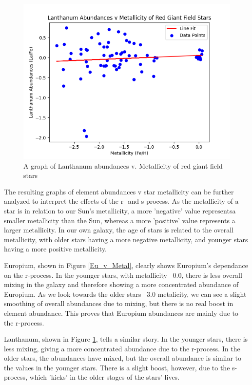 \begin{figure}[H]
  \includegraphics[width=\textwidth]{La_v_Metal.png}
  \caption{A graph of Lanthanum abundances v. Metallicity of red giant field stars}
  \label{La_v_Metal}
\end{figure}

The resulting graphs of element abundances v star metallicity can be further analyzed to interpret the effects of the r- and s-process. As the metallicity of a star is in relation to our Sun's metallicity, a more 'negative' value representsa smaller metallicity than the Sun, whereas a more 'positive' value represents a larger metallicity. In our own galaxy, the age of stars is related to the overall metallicity, with older stars having a more negative metallicity, and younger stars having a more positive metallicity.

Europium, shown in Figure \ref{Eu_v_Metal}, clearly shows Europium's dependance on the r-process. In the younger stars, with metallicity ~0.0, there is less overall mixing in the galaxy and therefore showing a more concentrated abundance of Europium. As we look towards the older stars ~3.0 metalicity, we can see a slight smoothing of overall abundances due to mixing, but there is no real boost in element abundance. This proves that Europium abundances are mainly due to the r-process.

Lanthanum, shown in Figure \ref{La_v_Metal}, tells a similar story. In the younger stars, there is less mixing, giving a more concentrated abundance due to the r-process. In the older stars, the abundances have mixed, but the overall abundance is similar to the values in the younger stars. There is a slight boost, however, due to the s-process, which 'kicks' in the older stages of the stars' lives. 


